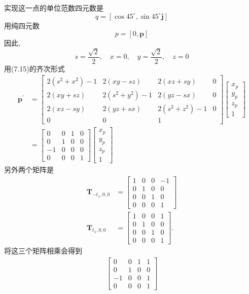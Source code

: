 实现这一点的单位范数四元数是
$$
q=\left[\cos 45^{\circ}, \sin 45^{\circ} \mathbf{j}\right]
$$
用纯四元数
$$
p=[0, \mathbf{p}]
$$
因此,
$$
s=\frac{\sqrt{2}}{2}, \quad x=0, \quad y=\frac{\sqrt{2}}{2}, \quad z=0
$$
用(7.15)的齐次形式
$$
\begin{aligned}
\mathbf{p}^{\prime} & =\left[\begin{array}{cccc}
2\left(s^{2}+x^{2}\right)-1 & 2(x y-s z) & 2(x z+s y) & 0 \\
2(x y+s z) & 2\left(s^{2}+y^{2}\right)-1 & 2(y z-s x) & 0 \\
2(x z-s y) & 2(y z+s x) & 2\left(s^{2}+z^{2}\right)-1 & 0 \\
0 & 0 & 1
\end{array}\right]\left[\begin{array}{c}
x_{p} \\
y_{p} \\
z_{p} \\
1
\end{array}\right] \\
& =\left[\begin{array}{cccc}
0 & 0 & 1 & 0 \\
0 & 1 & 0 & 0 \\
-1 & 0 & 0 & 0 \\
0 & 0 & 0 & 1
\end{array}\right]\left[\begin{array}{c}
x_{p} \\
y_{p} \\
z_{p} \\
1
\end{array}\right]
\end{aligned}
$$
另外两个矩阵是
$$
\begin{aligned}
\mathbf{T}_{-t_{x}, 0,0} & =\left[\begin{array}{cccc}
1 & 0 & 0 & -1 \\
0 & 1 & 0 & 0 \\
0 & 0 & 1 & 0 \\
0 & 0 & 0 & 1
\end{array}\right] \\
\mathbf{T}_{t_{x}, 0,0} & =\left[\begin{array}{llll}
1 & 0 & 0 & 1 \\
0 & 1 & 0 & 0 \\
0 & 0 & 1 & 0 \\
0 & 0 & 0 & 1
\end{array}\right] .
\end{aligned}
$$
将这三个矩阵相乘会得到
\begin{align}
\left[\begin{array}{cccc}
0 & 0 & 1 & 1 \\
0 & 1 & 0 & 0 \\
-1 & 0 & 0 & 1 \\
0 & 0 & 0 & 1
\end{array}\right]
\end{align}
